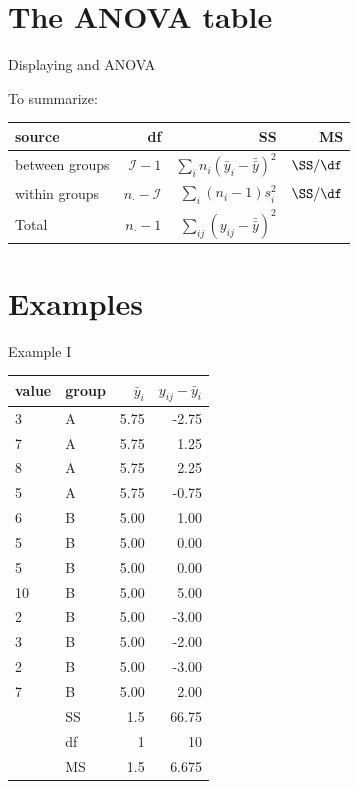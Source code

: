 \section{The ANOVA table}


\begin{frame}{Displaying and ANOVA}

  To summarize:
  \begin{center}
    \begin{tabular}{lrrr}
      source & df & SS & MS \\
      \hline
      between groups & $\mathcal{I}-1$ & $\sum_i n_i (\bar y_i - \bar{\bar y})^2$  & $\SS/\df$ \\
      within groups & $n_\cdot -\mathcal{I}$ & $\sum_i (n_i -1 )s_i^2$ & $\SS/\df$ \\
      \hline
      Total & $n_\cdot -1$  & $\sum_{ij} (y_{ij}-\bar{\bar y})^2$  & \\
    \end{tabular}
  \end{center}


\end{frame}


\section{Examples}


\begin{frame}{Example I}

\begin{tabular}{ll|rr}
  value & group & $\bar y_i$ & $y_{ij}-\bar y_i$  \\ 
  \hline
3   &  A  &  5.75  &  -2.75      \\
7   &  A  &  5.75  &  1.25       \\
8   &  A  &  5.75  &  2.25       \\
5   &  A  &  5.75  &  -0.75      \\
6   &  B  &  5.00     &  1.00          \\
5   &  B  &  5.00     &  0.00          \\
5   &  B  &  5.00     &  0.00          \\
10  &  B  &  5.00     &  5.00          \\
2   &  B  &  5.00     &  -3.00         \\
3   &  B  &  5.00     &  -2.00         \\
2   &  B  &  5.00     &  -3.00         \\
7   &  B  &  5.00     &  2.00        \\
   \hline
   & SS & 1.5 & 66.75 \\ 
   & df & 1 & 10 \\ 
   & MS & 1.5 & 6.675   \\ 
\end{tabular}

\end{frame}

